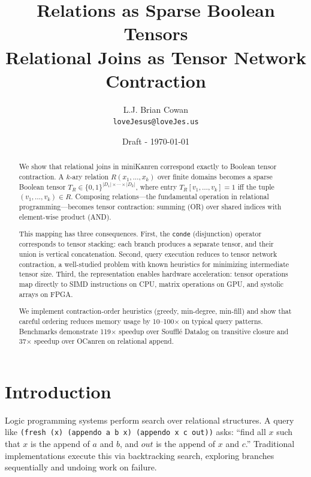 \documentclass[11pt,a4paper]{article}
\title{Relations as Sparse Boolean Tensors\\
\large Relational Joins as Tensor Network Contraction}
\author{
  L.J. Brian Cowan \\
  \texttt{loveJesus@loveJes.us}
}
\date{Draft - \today}
\begin{document}
\maketitle

\begin{abstract}
We show that relational joins in miniKanren correspond exactly to Boolean tensor contraction.
A $k$-ary relation $R(x_1, \ldots, x_k)$ over finite domains becomes a sparse Boolean tensor
$T_R \in \{0,1\}^{|D_1| \times \cdots \times |D_k|}$, where entry $T_R[v_1, \ldots, v_k] = 1$
iff the tuple $(v_1, \ldots, v_k) \in R$.
Composing relations---the fundamental operation in relational programming---becomes
tensor contraction: summing (OR) over shared indices with element-wise product (AND).

This mapping has three consequences.
First, the \texttt{conde} (disjunction) operator corresponds to tensor stacking:
each branch produces a separate tensor, and their union is vertical concatenation.
Second, query execution reduces to tensor network contraction, a well-studied problem
with known heuristics for minimizing intermediate tensor size.
Third, the representation enables hardware acceleration: tensor operations map directly
to SIMD instructions on CPU, matrix operations on GPU, and systolic arrays on FPGA.

We implement contraction-order heuristics (greedy, min-degree, min-fill) and show that
careful ordering reduces memory usage by 10--100$\times$ on typical query patterns.
Benchmarks demonstrate 119$\times$ speedup over Souffl\'e Datalog on transitive closure
and 37$\times$ speedup over OCanren on relational append.
\end{abstract}

\section{Introduction}
\label{sec:intro_chirho}

Logic programming systems perform search over relational structures.
A query like \texttt{(fresh (x) (appendo a b x) (appendo x c out))} asks:
``find all $x$ such that $x$ is the append of $a$ and $b$, and $out$ is the append of $x$ and $c$.''
Traditional implementations execute this via backtracking search, exploring branches
sequentially and undoing work on failure.

\scopeclarification
\end{document}
